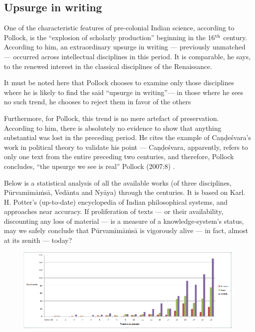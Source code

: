 \subsection{Upsurge in writing}%
One of the characteristic features of pre-colonial Indian science, according to Pollock, is the “explosion of scholarly production” beginning in the 16$^{\rm th}$ century. According to him, an extraordinary upsurge in writing — previously unmatched — occurred across intellectual disciplines in this period. It is comparable, he says, to the renewed interest in the classical disciplines of the Renaissance. 

It must be noted here that Pollock chooses to examine only those disciplines where he is likely to find the said “upsurge in writing”— in those where he sees no such trend, he chooses to reject them in favor of the others
\begin{myquote}
Furthermore, for Pollock, this trend is no mere artefact of preservation. According to him, there is absolutely no evidence to show that anything substantial was lost in the preceding period. He cites the example of Caṇḍeśvara’s work in political theory to validate his point — Caṇḍeśvara, apparently, refers to only one text from the entire preceding two centuries, and therefore, Pollock concludes, “the upsurge we see is real” Pollock (2007:8) .
\end{myquote}

Below is a statistical analysis of all the available works (of three disciplines, Pūrvamīmāṁsā, Vedānta and Nyāya) through the centuries. It is based on Karl. H. Potter’s (up-to-date) encyclopedia of Indian philosophical systems, and approaches near accuracy. If proliferation of texts — or their availability, discounting any loss of material — is a measure of a knowledge-system’s status, may we safely conclude that Pūrvamīmāṁsā is vigorously alive — in fact, almost at its zenith — today?   
\begin{figure}[h]
\centering
\includegraphics{figures/fig1.jpeg}
\caption{}\label{chap2-fig1}
\end{figure}

